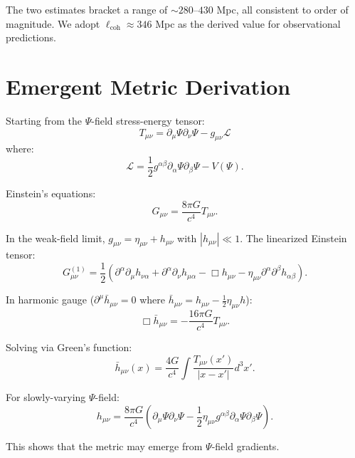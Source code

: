 The two estimates bracket a range of $\sim 280$--$430$ Mpc, all consistent to order of magnitude. We adopt $\ell_{\text{coh}} \approx 346$ Mpc as the derived value for observational predictions.

\section{Emergent Metric Derivation}
\label{app:metric}

Starting from the $\Psi$-field stress-energy tensor:
\begin{equation}
T_{\mu\nu} = \partial_\mu\Psi\partial_\nu\Psi - g_{\mu\nu}\mathcal{L}
\end{equation}
where:
\begin{equation}
\mathcal{L} = \frac{1}{2}g^{\alpha\beta}\partial_\alpha\Psi\partial_\beta\Psi - V(\Psi).
\end{equation}

Einstein's equations:
\begin{equation}
G_{\mu\nu} = \frac{8\pi G}{c^4}T_{\mu\nu}.
\end{equation}

In the weak-field limit, $g_{\mu\nu} = \eta_{\mu\nu} + h_{\mu\nu}$ with $|h_{\mu\nu}| \ll 1$. The linearized Einstein tensor:
\begin{equation}
G_{\mu\nu}^{(1)} = \frac{1}{2}(\partial^\alpha\partial_\mu h_{\nu\alpha} + \partial^\alpha\partial_\nu h_{\mu\alpha} - \Box h_{\mu\nu} - \eta_{\mu\nu}\partial^\alpha\partial^\beta h_{\alpha\beta}).
\end{equation}

In harmonic gauge ($\partial^\mu \bar{h}_{\mu\nu} = 0$ where $\bar{h}_{\mu\nu} = h_{\mu\nu} - \frac{1}{2}\eta_{\mu\nu}h$):
\begin{equation}
\Box \bar{h}_{\mu\nu} = -\frac{16\pi G}{c^4}T_{\mu\nu}.
\end{equation}

Solving via Green's function:
\begin{equation}
\bar{h}_{\mu\nu}(x) = \frac{4G}{c^4}\int \frac{T_{\mu\nu}(x')}{|x - x'|} d^3x'.
\end{equation}

For slowly-varying $\Psi$-field:
\begin{equation}
h_{\mu\nu} = \frac{8\pi G}{c^4}\left( \partial_\mu\Psi\partial_\nu\Psi - \frac{1}{2}\eta_{\mu\nu}g^{\alpha\beta}\partial_\alpha\Psi\partial_\beta\Psi \right).
\end{equation}

This shows that the metric may emerge from $\Psi$-field gradients.